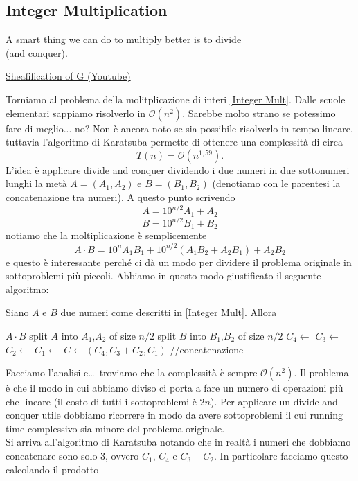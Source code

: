 \documentclass[11pt]{scrartcl}
\newcommand{\bigo}{\mathcal{O}}
\begin{document}
	\subsection{Integer Multiplication}
	\epigraph{A smart thing we can do to multiply better is to divide \\(and conquer).}{\href{https://youtu.be/KzT9I1d-LlQ?si=jjfIM4Gbbx8EPMqu&t=693}{Sheafification of G (Youtube)}}
	Torniamo al problema della molitplicazione di interi \ref{Integer Mult}. Dalle scuole elementari sappiamo risolverlo in $\bigo(n^2)$. Sarebbe molto strano se potessimo fare di meglio... no? Non è ancora noto se sia possibile risolverlo in tempo lineare, tuttavia l'algoritmo di Karatsuba permette di ottenere una complessità di circa
	$$T(n)=\bigo(n^{1,59}).$$
	L'idea è applicare divide and conquer dividendo i due numeri in due sottonumeri lunghi la metà $A=(A_1,A_2)$ e $B=(B_1,B_2)$ (denotiamo con le parentesi la concatenazione tra numeri). A questo punto scrivendo
	$$A=10^{n/2}A_1+A_2$$
	$$B=10^{n/2}B_1+B_2$$
	notiamo che la moltiplicazione è semplicemente
	$$A\cdot B=10^n A_1B_1+10^{n/2}(A_1B_2+A_2B_1)+A_2B_2$$
	e questo è interessante perché ci dà un modo per dividere il problema originale in sottoproblemi più piccoli. Abbiamo in questo modo giustificato il seguente algoritmo:
	\begin{algorithm}
		Siano $A$ e $B$ due numeri come descritti in \ref{Integer Mult}. Allora
		\begin{algorithmic}[1]
				\State \Return $A\cdot B$
			\EndIf
				\State split $A$ into $A_1$,$A_2$ of size $n/2$
				\State split $B$ into $B_1$,$B_2$ of size $n/2$
				\State $C_4 \gets$
				\State $C_3 \gets$
				\State $C_2 \gets$
				\State $C_1 \gets$
				\State $C \gets (C_4,C_3+C_2,C_1)$ \qquad //concatenazione
			\EndFunction
		\end{algorithmic} 
	\end{algorithm}
	Facciamo l'analisi e\dots\, troviamo che la complessità è sempre $\bigo(n^2)$. Il problema è che il modo in cui abbiamo diviso ci porta a fare un numero di operazioni più che lineare (il costo di tutti i sottoproblemi è $2n$). Per applicare un divide and conquer utile dobbiamo ricorrere in modo da avere sottoproblemi il cui running time complessivo sia minore del problema originale. \\
	Si arriva all'algoritmo di Karatsuba notando che in realtà i numeri che dobbiamo concatenare sono solo $3$, ovvero $C_1$, $C_4$ e $C_3+C_2$. In particolare facciamo questo calcolando il prodotto
\end{document}
